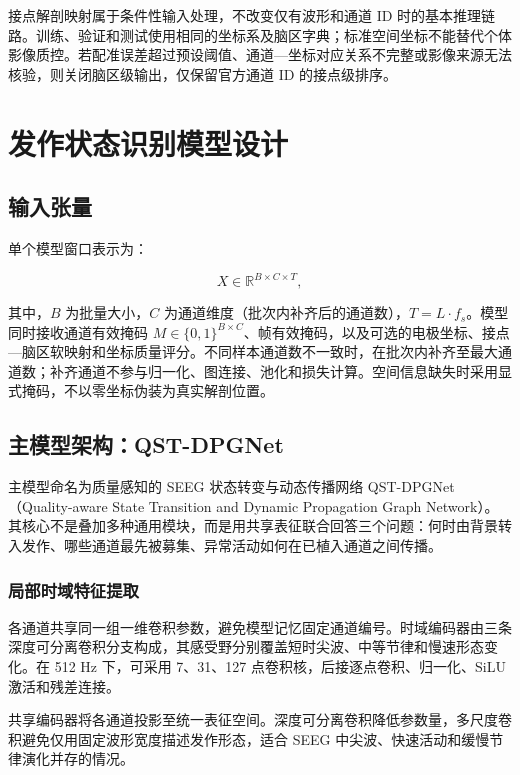 \documentclass{cumcmthesis}
\numberwithin{figure}{section} %
\numberwithin{table}{section} %
\begin{document}
接点解剖映射属于条件性输入处理，不改变仅有波形和通道 ID 时的基本推理链路。训练、验证和测试使用相同的坐标系及脑区字典；标准空间坐标不能替代个体影像质控。若配准误差超过预设阈值、通道—坐标对应关系不完整或影像来源无法核验，则关闭脑区级输出，仅保留官方通道 ID 的接点级排序。


\clearpage

\section{发作状态识别模型设计}


\subsection{输入张量}

单个模型窗口表示为：

$$
X\in\mathbb{R}^{B\times C\times T},
$$

其中，$B$ 为批量大小，$C$ 为通道维度（批次内补齐后的通道数），$T=L\cdot f_s$。模型同时接收通道有效掩码 $M\in\{0,1\}^{B\times C}$、帧有效掩码，以及可选的电极坐标、接点—脑区软映射和坐标质量评分。不同样本通道数不一致时，在批次内补齐至最大通道数；补齐通道不参与归一化、图连接、池化和损失计算。空间信息缺失时采用显式掩码，不以零坐标伪装为真实解剖位置。

\subsection{主模型架构：QST-DPGNet}

主模型命名为质量感知的 SEEG 状态转变与动态传播网络 QST-DPGNet（Quality-aware State Transition and Dynamic Propagation Graph Network）。其核心不是叠加多种通用模块，而是用共享表征联合回答三个问题：何时由背景转入发作、哪些通道最先被募集、异常活动如何在已植入通道之间传播。

\subsubsection{局部时域特征提取}

各通道共享同一组一维卷积参数，避免模型记忆固定通道编号。时域编码器由三条深度可分离卷积分支构成，其感受野分别覆盖短时尖波、中等节律和慢速形态变化。在 512 Hz 下，可采用 7、31、127 点卷积核，后接逐点卷积、归一化、SiLU 激活和残差连接。

共享编码器将各通道投影至统一表征空间。深度可分离卷积降低参数量，多尺度卷积避免仅用固定波形宽度描述发作形态，适合 SEEG 中尖波、快速活动和缓慢节律演化并存的情况。
\end{document}
